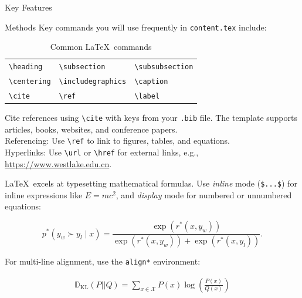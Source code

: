 \begin{frame}[t]
\begin{columns}[t]
\begin{column}{\colwidth}
\begin{alertblock}{Key Features}
 \end{alertblock}

  \begin{block}{Methods}
    Key commands you will use frequently in \texttt{content.tex} include:

    \begin{table}
      \centering
      \begin{tabular}{lll}
        \texttt{\textbackslash heading} & \texttt{\textbackslash subsection} & \texttt{\textbackslash subsubsection}\\
        \texttt{\textbackslash centering} & \texttt{\textbackslash includegraphics} & \texttt{\textbackslash caption}\\
        \texttt{\textbackslash cite} & \texttt{\textbackslash ref} & \texttt{\textbackslash label}\\
      \end{tabular}
      \caption{Common \LaTeX\ commands}
    \end{table}

    Cite references using \texttt{\textbackslash cite} with keys from your \texttt{.bib} file. The template supports articles, books, websites, and conference papers. \\
    Referencing: Use \texttt{\textbackslash ref} to link to figures, tables, and equations. \\
    Hyperlinks: Use \texttt{\textbackslash url} or \texttt{\textbackslash href} 
    for external links, e.g., \url{https://www.westlake.edu.cn}.

        \LaTeX\ excels at typesetting mathematical formulas. Use \textit{inline} mode 
    (\texttt{\$...\$}) for inline expressions like $E=mc^2$, and \textit{display} 
    mode for numbered or unnumbered equations:

    \begin{equation}
        p^{*}(y_{w}\succ y_{l} \mid x) = \frac{\exp(r^{*}(x,y_{w}))}{\exp(r^{*}(x,y_{w}))+\exp(r^{*}(x,y_{l}))}. \label{eq:poster1}
    \end{equation}

    For multi-line alignment, use the \texttt{align*} environment:

    \begin{align*}
        \mathbb{D}_{\text{KL}}(P || Q) = \sum_{x \in \mathcal{X}} P(x)\log \left( \frac{P(x)}{Q(x)} \right)
    \end{align*}


\end{block}
\end{column}
\end{columns}
\end{frame}
